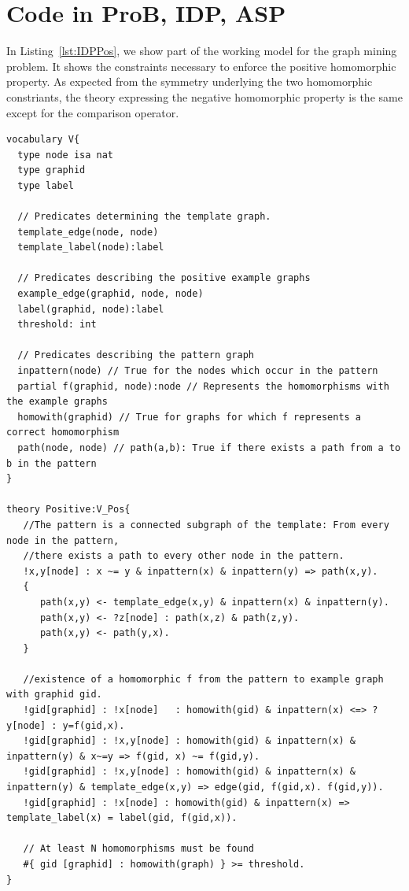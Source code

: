\section{Code in ProB, IDP, ASP}\label{sec:code}
\pagebreak

In Listing~\ref{lst:IDPPos}, we show part of the working model for the graph mining problem.
It shows the constraints necessary to enforce the positive homomorphic property.
As expected from the symmetry underlying the two homomorphic constriants, the theory expressing the negative homomorphic property is the same except for the comparison operator.

\begin{lstlisting}[caption=IDP positive constraint, style=model, label=lst:IDPPos]
vocabulary V{
  type node isa nat
  type graphid
  type label

  // Predicates determining the template graph.
  template_edge(node, node) 
  template_label(node):label

  // Predicates describing the positive example graphs
  example_edge(graphid, node, node)
  label(graphid, node):label
  threshold: int

  // Predicates describing the pattern graph
  inpattern(node) // True for the nodes which occur in the pattern
  partial f(graphid, node):node // Represents the homomorphisms with the example graphs
  homowith(graphid) // True for graphs for which f represents a correct homomorphism
  path(node, node) // path(a,b): True if there exists a path from a to b in the pattern
}

theory Positive:V_Pos{
   //The pattern is a connected subgraph of the template: From every node in the pattern, 
   //there exists a path to every other node in the pattern.
   !x,y[node] : x ~= y & inpattern(x) & inpattern(y) => path(x,y).
   {
      path(x,y) <- template_edge(x,y) & inpattern(x) & inpattern(y).
      path(x,y) <- ?z[node] : path(x,z) & path(z,y).
      path(x,y) <- path(y,x).
   }

   //existence of a homomorphic f from the pattern to example graph with graphid gid.
   !gid[graphid] : !x[node]   : homowith(gid) & inpattern(x) <=> ? y[node] : y=f(gid,x).
   !gid[graphid] : !x,y[node] : homowith(gid) & inpattern(x) & inpattern(y) & x~=y => f(gid, x) ~= f(gid,y).
   !gid[graphid] : !x,y[node] : homowith(gid) & inpattern(x) & inpattern(y) & template_edge(x,y) => edge(gid, f(gid,x). f(gid,y)).
   !gid[graphid] : !x[node] : homowith(gid) & inpattern(x) => template_label(x) = label(gid, f(gid,x)).

   // At least N homomorphisms must be found
   #{ gid [graphid] : homowith(graph) } >= threshold.
}
\end{lstlisting}


